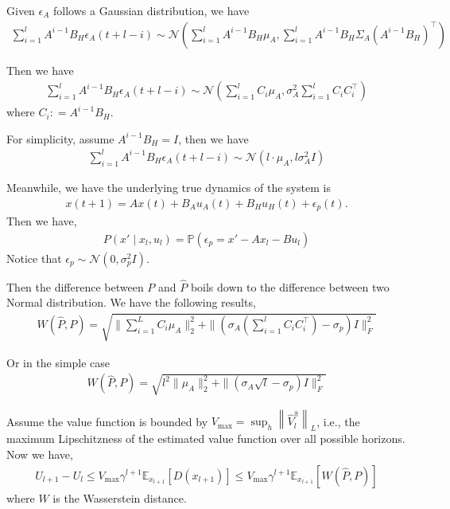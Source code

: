 Given $\epsilon_A$ follows a Gaussian distribution, we have
\begin{align*}
    \sum_{i=1}^{l}A^{i-1}B_H\epsilon_A(t+l-i) \sim \mathcal{N} (\sum_{i=1}^{l}A^{i-1}B_H \mu_A, \sum_{i=1}^{l} A^{i-1}B_H \Sigma_A (A^{i-1}B_H )^{\top}  )
\end{align*}

Then we have
\begin{align*}
     \sum_{i=1}^{l}A^{i-1}B_H\epsilon_A(t+l-i) \sim \mathcal{N} (\sum_{i=1}^l C_i \mu_A,  \sigma_A^2 \sum_{i=1}^l C_iC_i^{\top} )
\end{align*}
where $C_i : = A^{i-1}B_H$. 

For simplicity, assume $A^{i-1}B_H = I$, then we have
\begin{align}
      \sum_{i=1}^{l}A^{i-1}B_H\epsilon_A(t+l-i) \sim \mathcal{N} (l \cdot \mu_A, l \sigma_A^2 I ) \label{eqn:app:accumulation1}
\end{align}

Meanwhile, we have the underlying true dynamics of the system is 
\begin{align*}
    x(t+1) = Ax(t) + B_Au_A(t) + B_H u_H(t)  + \epsilon_p(t).
\end{align*}
Then we have,
\begin{align*}
    {P}\left(x' \mid x_l, u_l\right) = \mathbb{P}(\epsilon_p = x'-Ax_l-Bu_l)
\end{align*}
Notice that $\epsilon_p \sim \mathcal{N}(0,\sigma_p^2 I)$.

Then the difference between $P$ and $\hat{{P}}$ boils down to the difference between two Normal distribution. We have the following results,
\begin{align*}
      W(\hat{P},P)  = \sqrt{\|\sum_{i=1}^LC_i\mu_A\|_2^2 + \|(\sigma_A \left(\sum_{i=1}^lC_iC_i^{\top}\right) - \sigma_p) I\|_F^2}
\end{align*}


Or in the simple case
\begin{align*}
    W(\hat{P},P) = \sqrt{l^2 \|\mu_A\|_2^2 + \|(\sigma_A \sqrt{l} - \sigma_p) I\|_F^2}
\end{align*}



Assume the value function is bounded by $V_{\max}=\sup _h\left\|\hat{V}^{\hat{\pi}}_ {l}\right\|_L$, i.e., the maximum Lipschitzness of the estimated value function over all possible horizons. Now we have,
\begin{align}
    U_{l+1}-U_{l} \leq V_{\max}\gamma^{l+1} \mathbb{E}_{x_{l+1}}[D(x_{l+1})]\leq V_{\max}\gamma^{l+1} \mathbb{E}_{x_{l+1}}[W(\hat{P},P)]
\end{align}
where $W$ is the Wasserstein distance.

